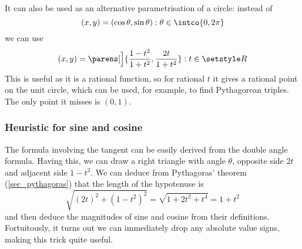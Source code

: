 It can also be used as an alternative parametrisation of a circle: instead
of
\begin{equation*}
(x, y) = (\cos\theta, \sin\theta): \theta \in \intco{0, 2\pi}
\end{equation*}
we can use
\begin{equation*}
    (x, y) = \parens[\Big]{\frac{1 - t^2}{1 + t^2}, \frac{2t}{1 + t^2}}: t \in \Reals
\end{equation*}
This is useful as it is a rational function, so for rational \(t\) it gives
a rational point on the unit circle, which can be used, for example, to find
Pythagorean triples. The only point it misses is \((0, 1)\).

\subsubsection{Heuristic for sine and cosine}


The formula involving the tangent can be easily derived from the double
angle formula. Having this, we can draw a right triangle with angle
\(\theta\), opposite side \(2t\) and adjacent side \(1 - t^2\). We can
deduce from Pythagoras' theorem (\ref{sec_pythagoras}) that the length of
the hypotenuse is
\begin{equation*}
\sqrt{(2t)^2 + (1 - t^2)^2} = \sqrt{1 + 2t^2 + t^4} = 1 + t^2
\end{equation*}
and then deduce the magnitudes of sine and cosine from their definitions.
Fortuitously, it turns out we can immediately drop any absolute value
signs, making this trick quite useful.
